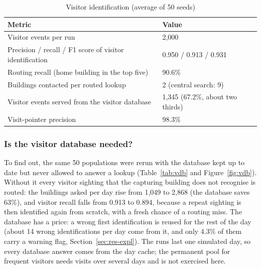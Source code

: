\documentclass[12pt,a4paper,oneside]{report}
\begin{document}
\begin{table}[htbp]
\centering
\caption{Visitor identification (average of 50 seeds)}\label{tab:visitors}
{\small\setlength{\tabcolsep}{4pt}\renewcommand{\arraystretch}{1.2}
\begin{tabular}{|p{8.4cm}|p{3.0cm}|}\hline
\textbf{Metric} & \textbf{Value}\\\hline
Visitor events per run & 2,000\\\hline
Precision / recall / F1 score of visitor identification & 0.950 / 0.913 / 0.931\\\hline
Routing recall (home building in the top five) & 90.6\%\\\hline
Buildings contacted per routed lookup & 2 (central search: 9)\\\hline
Visitor events served from the visitor database & 1,345 (67.2\%, about two thirds)\\\hline
Visit-pointer precision & 98.3\%\\\hline
\end{tabular}}
\end{table}

\subsubsection{Is the visitor database needed?}
To find out, the same 50 populations were rerun with the database kept up to date but never allowed to answer a lookup (Table~\ref{tab:vdb} and Figure~\ref{fig:vdb}). Without it every visitor sighting that the capturing building does not recognise is routed: the buildings asked per day rise from 1,049 to 2,868 (the database saves 63\%), and visitor recall falls from 0.913 to 0.894, because a repeat sighting is then identified again from scratch, with a fresh chance of a routing miss. The database has a price: a wrong first identification is reused for the rest of the day (about 14 wrong identifications per day come from it, and only 4.3\% of them carry a warning flag, Section~\ref{sec:res-expl}). The runs last one simulated day, so every database answer comes from the day cache; the permanent pool for frequent visitors needs visits over several days and is not exercised here.
\end{document}
